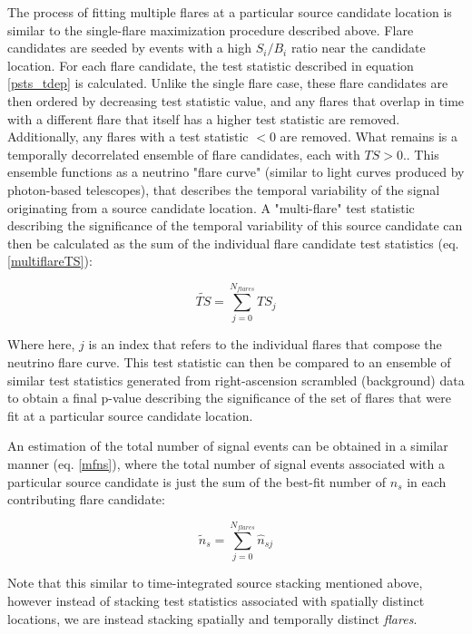 The process of fitting multiple flares at a particular source candidate location is similar to the single-flare maximization procedure described above. Flare candidates are seeded by events with a high $S_i/B_i$ ratio near the candidate location. For each flare candidate, the test statistic described in equation \ref{psts_tdep} is calculated. Unlike the single flare case, these flare candidates are then ordered by decreasing test statistic value, and any flares that overlap in time with a different flare that itself has a higher test statistic are removed. Additionally, any flares with a test statistic $< 0$ are removed. What remains is a temporally decorrelated ensemble of flare candidates, each with $TS>0.$. This ensemble functions as a neutrino "flare curve" (similar to light curves produced by photon-based telescopes), that describes the temporal variability of the signal originating from a source candidate location. A "multi-flare" test statistic describing the significance of the temporal variability of this source candidate can then be calculated as the sum of the individual flare candidate test statistics (eq. \ref{multiflareTS}):

\begin{equation}
    \widetilde{TS} = \sum_{j=0}^{N_{flares}} TS_{j}
    \label{multiflareTS}
\end{equation}

Where here, $j$ is an index that refers to the individual flares that compose the neutrino flare curve. This test statistic can then be compared to an ensemble of similar test statistics generated from right-ascension scrambled (background) data to obtain a final p-value describing the significance of the set of flares that were fit at a particular source candidate location. 

An estimation of the total number of signal events can be obtained in a similar manner (eq. \ref{mfns}), where the total number of signal events associated with a particular source candidate is just the sum of the best-fit number of $n_s$ in each contributing flare candidate:

\begin{equation}
    \widetilde{n}_s = \sum_{j=0}^{N_{flares}} \hat{n}_{sj}
    \label{mfns}
\end{equation}

Note that this similar to time-integrated source stacking mentioned above, however instead of stacking test statistics associated with spatially distinct locations, we are instead stacking spatially and temporally distinct \textit{flares}.

